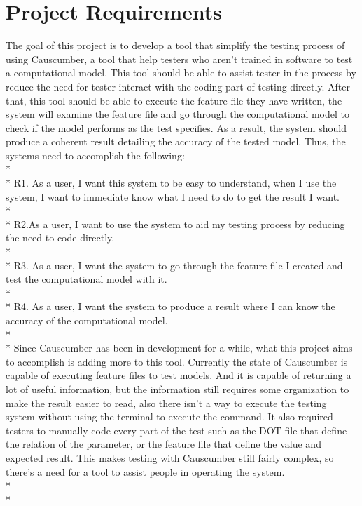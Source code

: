 \section{Project Requirements}
The goal of this project is to develop a tool that simplify the testing process of using Causcumber, a tool that help testers who aren’t trained in software to test a computational model. This tool should be able to assist tester in the process by reduce the need for tester interact with the coding part of testing directly. After that, this tool should be able to execute the feature file they have written, the system will examine the feature file and go through the computational model to check if the model performs as the test specifies. As a result, the system should produce a coherent result detailing the accuracy of the tested model. Thus, the systems need to accomplish the following:\\*
\\*
R1. As a user, I want this system to be easy to understand, when I use the system, I want to immediate know what I need to do to get the result I want.\\*
\\*
R2.As a user, I want to use the system to aid my testing process by reducing the need to code directly. \\*
\\*
R3. As a user, I want the system to go through the feature file I created and test the computational model with it.\\*
\\*
R4. As a user, I want the system to produce a result where I can know the accuracy of the computational model.\\*
\\*
Since Causcumber has been in development for a while, what this project aims to accomplish is adding more to this tool. Currently the state of Causcumber is capable of executing feature files to test models. And it is capable of returning a lot of useful information, but the information still requires some organization to make the result easier to read, also there isn’t a way to execute the testing system without using the terminal to execute the command. It also required testers to manually code every part of the test such as the DOT file that define the relation of the parameter, or the feature file that define the value and expected result. This makes testing with Causcumber still fairly complex, so there’s a need for a tool to assist people in operating the system. \\*\\*

